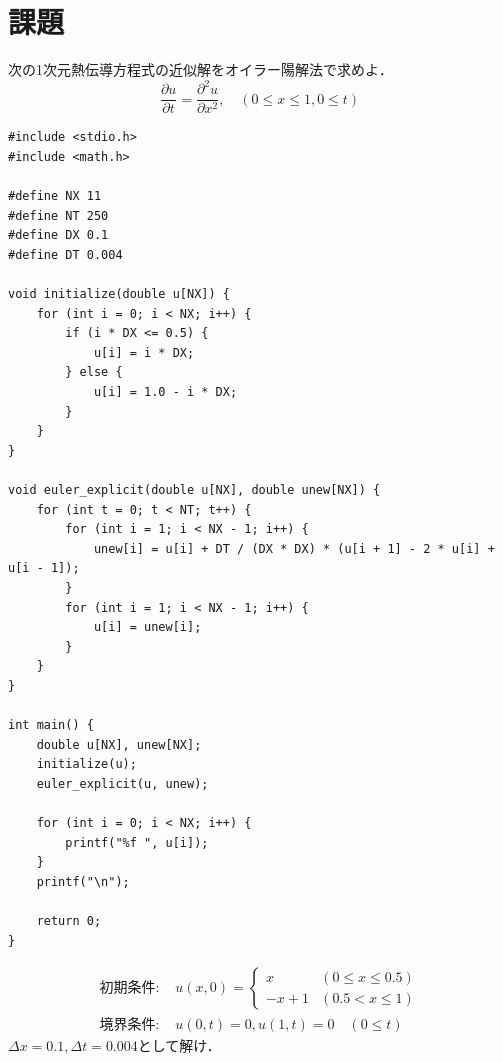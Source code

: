 \documentclass[platex,dvipdfmx,]{jarticle}
\begin{document}
%

\section*{課題}次の1次元熱伝導方程式の近似解をオイラー陽解法で求めよ．
\begin{equation*}
    \frac{\partial u}{\partial t} = \frac{\partial^2 u}{\partial x^2}
    ,\quad (0\leq x\leq 1,0\leq t)
\end{equation*}



\begin{lstlisting}[caption={1次元熱伝導方程式のオイラー陽解法による近似解}, label={lst:heat_equation}]
#include <stdio.h>
#include <math.h>

#define NX 11
#define NT 250
#define DX 0.1
#define DT 0.004

void initialize(double u[NX]) {
    for (int i = 0; i < NX; i++) {
        if (i * DX <= 0.5) {
            u[i] = i * DX;
        } else {
            u[i] = 1.0 - i * DX;
        }
    }
}

void euler_explicit(double u[NX], double unew[NX]) {
    for (int t = 0; t < NT; t++) {
        for (int i = 1; i < NX - 1; i++) {
            unew[i] = u[i] + DT / (DX * DX) * (u[i + 1] - 2 * u[i] + u[i - 1]);
        }
        for (int i = 1; i < NX - 1; i++) {
            u[i] = unew[i];
        }
    }
}

int main() {
    double u[NX], unew[NX];
    initialize(u);
    euler_explicit(u, unew);

    for (int i = 0; i < NX; i++) {
        printf("%f ", u[i]);
    }
    printf("\n");

    return 0;
}
\end{lstlisting}
\begin{align*}
初期条件:\,& u(x,0) =
\begin{cases}
    x & (0 \leq x \leq 0.5) \\
    -x+1 & (0.5 < x \leq 1)
\end{cases}\\
境界条件:\,& u(0,t) = 0, u(1,t) = 0 \quad (0\leq t)
\end{align*}
$\Delta x = 0.1,\Delta t = 0.004$として解け．
\end{document}
